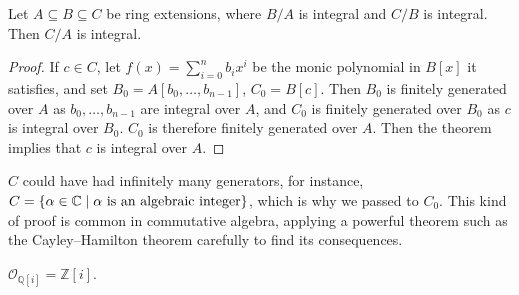 \begin{corollary}
    Let \( A \subseteq B \subseteq C \) be ring extensions, where \( B / A \) is integral and \( C / B \) is integral.
    Then \( C / A \) is integral.
\end{corollary}
\begin{proof}
    If \( c \in C \), let \( f(x) = \sum_{i=0}^n b_i x^i \) be the monic polynomial in \( B[x] \) it satisfies, and set \( B_0 = A[b_0, \dots, b_{n-1}] \), \( C_0 = B[c] \).
    Then \( B_0 \) is finitely generated over \( A \) as \( b_0, \dots, b_{n-1} \) are integral over \( A \), and \( C_0 \) is finitely generated over \( B_0 \) as \( c \) is integral over \( B_0 \).
    \( C_0 \) is therefore finitely generated over \( A \).
    Then the theorem implies that \( c \) is integral over \( A \).
\end{proof}
\begin{remark}
    \( C \) could have had infinitely many generators, for instance, \( C = \qty{\alpha \in \mathbb C \mid \alpha \text{ is an algebraic integer}} \), which is why we passed to \( C_0 \).
    This kind of proof is common in commutative algebra, applying a powerful theorem such as the Cayley--Hamilton theorem carefully to find its consequences.
\end{remark}
\begin{example}
    \( \mathcal O_{\mathbb Q[i]} = \mathbb Z[i] \).
\end{example}

